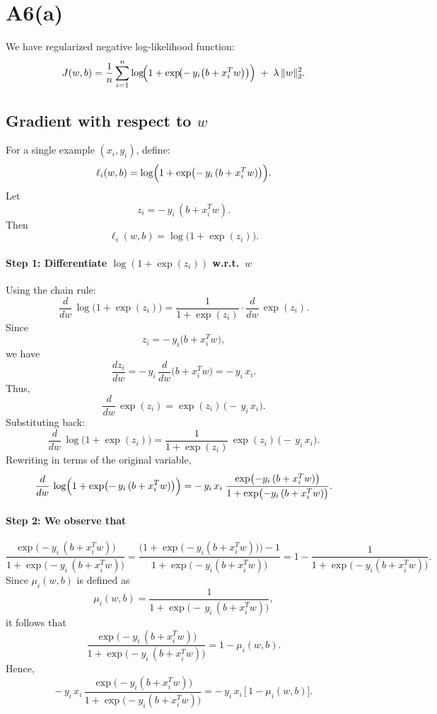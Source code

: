 \documentclass{article}
\begin{document}
\section*{A6(a)}

We have regularized negative log-likelihood function:
\[
J(w, b)
= \frac{1}{n} \sum_{i=1}^{n}
  \log\!\Bigl(1 + \exp\!\bigl(-\,y_i \bigl(b + x_i^T w\bigr)\bigr)\Bigr)
\;+\;
\lambda \,\|w\|_2^2.
\]

\subsection*{Gradient with respect to \(w\)}

For a single example \((x_i, y_i)\), define:
\[
\ell_i(w,b)
= \log\Bigl(1 + \exp\bigl(-\,y_i\,(b + x_i^T w)\bigr)\Bigr).
\]
Let
\[
z_i = -\,y_i\,(b + x_i^T w).
\]
Then
\[
\ell_i(w,b)
= \log\bigl(1 + \exp(z_i)\bigr).
\]

\paragraph{Step 1: Differentiate \(\log(1 + \exp(z_i))\) w.r.t.\ \(w\)}
Using the chain rule:
\[
\frac{d}{dw}\,\log\bigl(1 + \exp(z_i)\bigr)
= \frac{1}{1 + \exp(z_i)} \cdot \frac{d}{dw}\,\exp(z_i).
\]
Since
\[
z_i
= -\,y_i \bigl(b + x_i^T w\bigr),
\]
we have
\[
\frac{dz_i}{dw}
= -\,y_i\,\frac{d}{dw}\bigl(b + x_i^T w\bigr)
= -\,y_i\,x_i.
\]
Thus,
\[
\frac{d}{dw}\,\exp(z_i)
= \exp(z_i)\,\bigl(-\,y_i\,x_i\bigr).
\]
Substituting back:
\[
\frac{d}{dw}\,\log\bigl(1 + \exp(z_i)\bigr)
= \frac{1}{1 + \exp(z_i)}
  \,\exp(z_i)\,\bigl(-\,y_i\,x_i\bigr).
\]
Rewriting in terms of the original variable,
\[
\frac{d}{dw}\,\log\Bigl(1 + \exp\bigl(-\,y_i\,(b + x_i^T w)\bigr)\Bigr)
= -\,y_i\,x_i
  \;\frac{\exp\bigl(-y_i\,(b + x_i^T w)\bigr)}{1 + \exp\bigl(-y_i\,(b + x_i^T w)\bigr)}.
\]

\paragraph{Step 2: We observe that}
\[
\frac{\exp\bigl(-y_i\,(b + x_i^T w)\bigr)}{1 + \exp\bigl(-y_i\,(b + x_i^T w)\bigr)}
= \frac{\bigl(1 + \exp\bigl(-y_i(b + x_i^T w)\bigr)\bigr) - 1}{1 + \exp\bigl(-y_i(b + x_i^T w)\bigr)}
= 1 - \frac{1}{1 + \exp\bigl(-y_i(b + x_i^T w)\bigr)}.
\]
Since \(\mu_i(w,b)\) is defined as
\[
\mu_i(w,b) 
= \frac{1}{1 + \exp\!\bigl(-\,y_i\,(b + x_i^T w)\bigr)},
\]
it follows that
\[
\frac{\exp\bigl(-y_i\,(b + x_i^T w)\bigr)}{1 + \exp\bigl(-y_i\,(b + x_i^T w)\bigr)}
= 1 - \mu_i(w,b).
\]
Hence,
\[
-\,y_i \,x_i \,\frac{\exp\bigl(-y_i(b + x_i^T w)\bigr)}{1 + \exp\bigl(-y_i(b + x_i^T w)\bigr)}
= -\,y_i \,x_i \,\bigl[\,1 - \mu_i(w,b)\bigr].
\]
\end{document}
